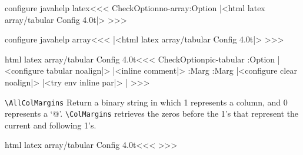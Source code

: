 \<configure javahelp latex\><<<
\:CheckOption{no-array}\if:Option \else
   |<html latex array/tabular Config 4.0t|>
\fi
>>>



\<configure javahelp array\><<<
|<html latex array/tabular Config 4.0t|>
>>>


\<html latex array/tabular Config 4.0t\><<<
\:CheckOption{pic-tabular}  \if:Option \else
     {|<configure tabular noalign|>%
      \IgnorePar|<inline comment|>\EndP{}%
      \PushStack\Col:Marg\AllColMargins
     }
     {\PopStack\Col:Marg\AllColMargins\ShowPar
      |<configure clear noalign|>%
      |<try env inline par|>%
     }{}{}
       |%
\fi
>>>


\verb'\AllColMargins' Return a binary string in which 1 represents
a column, and 0 represents a `@'. \verb'\ColMargins' retrieves the
zeros before the 1's that represent the current and following 1's.

\<html latex array/tabular Config 4.0t\><<<
\def\ColMargins{%
   \ifx \AllColMargins\empty
      \:warning{Empty \string\AllColMargins}%
   \else
      \tmp:cnt=\HCol\relax 
      \expandafter\nosp:hbr\AllColMargins 1//%
   \fi }
\def\nosp:hbr#11#2//{\ifnum \tmp:cnt>1 \advance\tmp:cnt by -1
   \nosp:hbr#2//\else\nosp:gt#11#2//\fi}
\def\nosp:gt#11#21#3//{%
   \def\:temp{#1}\ifx \:temp\empty 1\else 0\fi
   \def\:temp{#2}\ifx \:temp\empty 1\else 0\fi}
>>>




